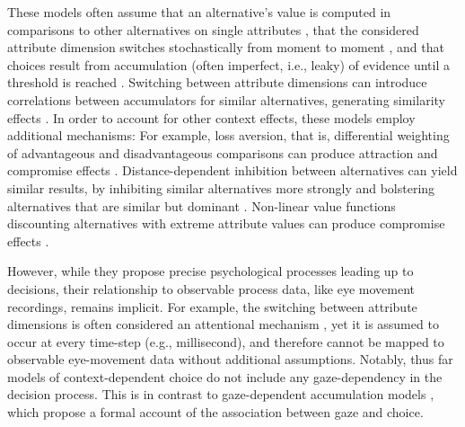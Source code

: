 \documentclass[11pt, a4paper]{article}
\begin{document}
These models often assume that an alternative’s value is computed in comparisons to other alternatives on single attributes \autocite{roe2001MultialternativeDecisionField,usher2004LossAversionInhibition}, that the considered attribute dimension switches stochastically from moment to moment \autocite{bhatia2013AssociationsAccumulationPreference,roe2001MultialternativeDecisionField,usher2004LossAversionInhibition}, and that choices result from accumulation (often imperfect, i.e., leaky) of evidence until a threshold is reached \autocite{bhatia2013AssociationsAccumulationPreference,roe2001MultialternativeDecisionField,trueblood2014MultiattributeLinearBallistic,usher2004LossAversionInhibition}. Switching between attribute dimensions can introduce correlations between accumulators for similar alternatives, generating similarity effects \autocite{bhatia2013AssociationsAccumulationPreference,roe2001MultialternativeDecisionField,turner2018CompetingTheoriesMultialternative,usher2004LossAversionInhibition}. In order to account for other context effects, these models employ additional mechanisms: For example, loss aversion, that is, differential weighting of advantageous and disadvantageous comparisons can produce attraction and compromise effects \autocite{usher2004LossAversionInhibition}. Distance-dependent inhibition between alternatives can yield similar results, by inhibiting similar alternatives more strongly and bolstering alternatives that are similar but dominant \autocite{roe2001MultialternativeDecisionField}. Non-linear value functions discounting alternatives with extreme attribute values can produce compromise effects \autocite{trueblood2014MultiattributeLinearBallistic}. 

However, while they propose precise psychological processes leading up to decisions, their relationship to observable process data, like eye movement recordings, remains implicit. For example, the switching between attribute dimensions is often considered an attentional mechanism \autocite{bhatia2013AssociationsAccumulationPreference,roe2001MultialternativeDecisionField,turner2018CompetingTheoriesMultialternative,usher2004LossAversionInhibition}, yet it is assumed to occur at every time-step (e.g., millisecond), and therefore cannot be mapped to observable eye-movement data without additional assumptions. Notably, thus far models of context-dependent choice do not include any gaze-dependency in the decision process. This is in contrast to gaze-dependent accumulation models \autocite{cavanagh2014EyeTrackingPupillometry,glickman2019FormationPreferenceRisky,krajbich2010VisualFixationsComputation,krajbich2011MultialternativeDriftdiffusionModel,molter2019GLAMboxPythonToolbox,thomas2019GazeBiasDifferences}, which propose a formal account of the association between gaze and choice.
\end{document}
